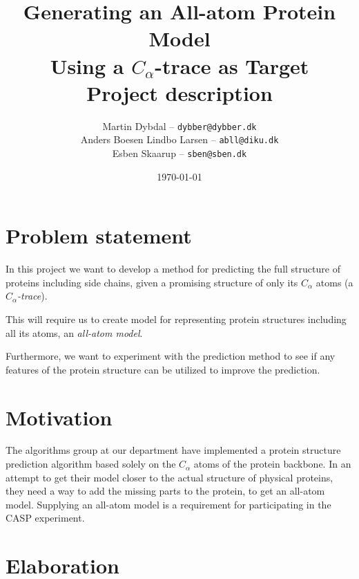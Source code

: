 \documentclass[10pt,a4paper,final,oneside,openany,article]{memoir}
\title{
  Generating an All-atom Protein Model \\ Using a $C_\alpha$-trace as Target \\
  \small{Project description}
}
\author{
	Martin Dybdal -- \texttt{dybber@dybber.dk}\\
	Anders Boesen Lindbo Larsen -- \texttt{abll@diku.dk} \\
    Esben Skaarup -- \texttt{sben@sben.dk}
}
\date{\today}
\begin{document}
\maketitle

\section{Problem statement}
In this project we want to develop a method for predicting the full
structure of proteins including side chains, given a promising
structure of only its $C_\alpha$ atoms (a \textit{$C_\alpha$-trace}). 

This will require us to create model for representing protein
structures including all its atoms, an \textit{all-atom model}.

Furthermore, we want to experiment with the prediction method to see
if any features of the protein structure can be utilized to
improve the prediction.


\section{Motivation}
The algorithms group at our department have implemented a protein
structure prediction algorithm based solely on the $C_\alpha$ atoms of
the protein backbone. In an attempt to get their model closer to the
actual structure of physical proteins, they need a way to add the
missing parts to the protein, to get an all-atom model.  Supplying an
all-atom model is a requirement for participating in the CASP
experiment.


\section{Elaboration}

\begin{figure}
  \centering
\end{figure}
\end{document}
